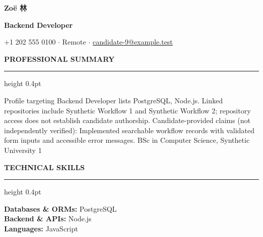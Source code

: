 \documentclass[10pt,letterpaper]{article}
\newcommand{\atsHeaderToSection}{6.5pt}
\newcommand{\atsSectionToSection}{6.1pt}
\newcommand{\atsHeadingToContent}{2pt}
\newcommand{\atssection}[1]{%
  \vspace{\atsSectionToSection}%
  {\noindent\large\bfseries\uppercase{#1}}\par
  \vspace{1.5pt}\hrule height 0.4pt\vspace{\atsHeadingToContent}%
}
\newcommand{\atsfirstsection}[1]{%
  \vspace{\atsHeaderToSection}%
  {\noindent\large\bfseries\uppercase{#1}}\par
  \vspace{1.5pt}\hrule height 0.4pt\vspace{\atsHeadingToContent}%
}
\begin{document}
{\centering
  {\Huge \textbf{Zoë 林}}\par
  \vspace{3pt}
  {\large \textbf{Backend Developer}}\par
  \vspace{3pt}
  {\small +1 202 555 0100 $\cdot$ Remote $\cdot$ \href{mailto:candidate-9@example.test}{candidate-9@example.test}}\par
}

\atsfirstsection{Professional Summary}
Profile targeting Backend Developer lists PostgreSQL, Node.js. Linked repositories include Synthetic Workflow 1 and Synthetic Workflow 2; repository access does not establish candidate authorship. Candidate-provided claims (not independently verified): Implemented searchable workflow records with validated form inputs and accessible error messages. BSc in Computer Science, Synthetic University 1\par

\atssection{Technical Skills}
\textbf{Databases \& ORMs:} PostgreSQL\\
\textbf{Backend \& APIs:} Node.js\\
\textbf{Languages:} JavaScript\par
\end{document}
